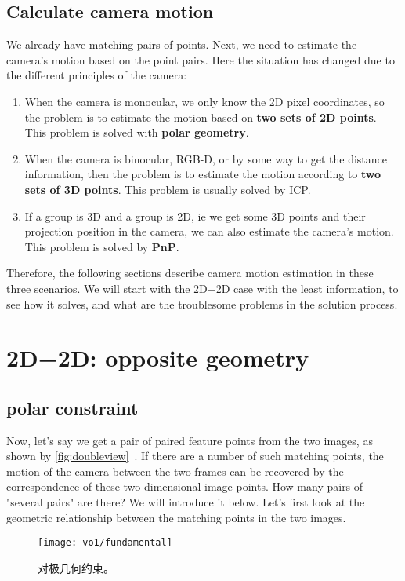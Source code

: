 \subsection{Calculate camera motion}
We already have matching pairs of points. Next, we need to estimate the camera's motion based on the point pairs. Here the situation has changed due to the different principles of the camera:

\begin{enumerate}
\item When the camera is monocular, we only know the 2D pixel coordinates, so the problem is to estimate the motion based on \textbf{two sets of 2D points}. This problem is solved with \textbf{polar geometry}.
\item When the camera is binocular, RGB-D, or by some way to get the distance information, then the problem is to estimate the motion according to \textbf{two sets of 3D points}. This problem is usually solved by ICP.
\item If a group is 3D and a group is 2D, ie we get some 3D points and their projection position in the camera, we can also estimate the camera's motion. This problem is solved by \textbf{PnP}.
\end{enumerate}

Therefore, the following sections describe camera motion estimation in these three scenarios. We will start with the 2D−2D case with the least information, to see how it solves, and what are the troublesome problems in the solution process.

\section{2D−2D: opposite geometry}
\label{sec:epipolar-geometry}

\subsection{polar constraint}

Now, let's say we get a pair of paired feature points from the two images, as shown by \autoref{fig:doubleview}~. If there are a number of such matching points, the motion of the camera between the two frames can be recovered by the correspondence of these two-dimensional image points. How many pairs of "several pairs" are there? We will introduce it below. Let's first look at the geometric relationship between the matching points in the two images.
\begin{figure}[!htp]
	\centering
	\texttt{[image: vo1/fundamental]}
	\caption{对极几何约束。}
	\label{fig:doubleview}
\end{figure}


